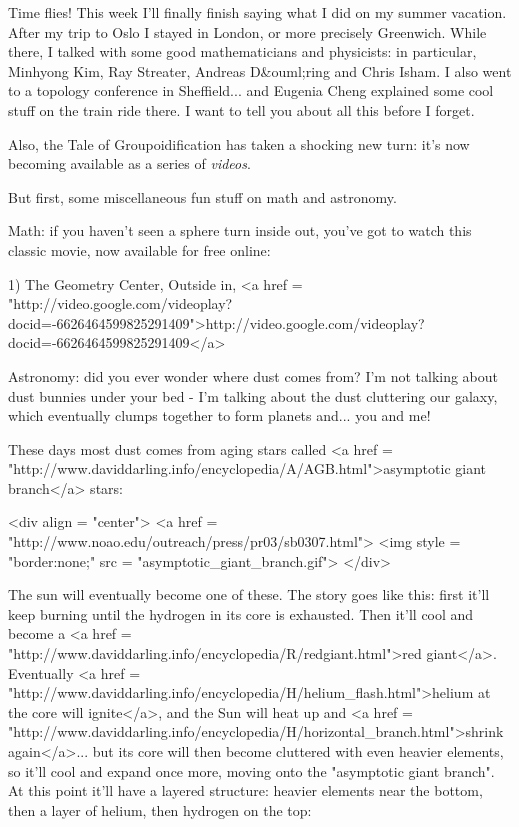 

Time flies!  This week I'll finally finish saying what I did on 
my summer vacation.  After my trip to Oslo I stayed in London, 
or more precisely Greenwich.  While there, I talked with some good 
mathematicians and physicists: in particular, Minhyong Kim, Ray 
Streater, Andreas D&ouml;ring and Chris Isham.  I also went to a 
topology conference in Sheffield... and Eugenia Cheng explained
some cool stuff on the train ride there.  I want to tell you about 
all this before I forget.

Also, the Tale of Groupoidification has taken a shocking new
turn: it's now becoming available as a series of \emph{videos}.

But first, some miscellaneous fun stuff on math and astronomy.  

Math: if you haven't seen a sphere turn inside out, you've got 
to watch this classic movie, now available for free online:

1) The Geometry Center, Outside in,
<a href = "http://video.google.com/videoplay?docid=-6626464599825291409">http://video.google.com/videoplay?docid=-6626464599825291409</a>

Astronomy: did you ever wonder where dust comes from?  I'm 
not talking about dust bunnies under your bed - I'm talking 
about the dust cluttering our galaxy, which eventually clumps 
together to form planets and... you and me!

These days most dust comes from aging stars called <a href =
"http://www.daviddarling.info/encyclopedia/A/AGB.html">asymptotic
giant branch</a> stars: 

<div align = "center">
<a href = "http://www.noao.edu/outreach/press/pr03/sb0307.html">
<img style = "border:none;" src = "asymptotic_giant_branch.gif">
</div>

The sun will eventually become one of these.
The story goes like this: first it'll keep burning until the hydrogen
in its core is exhausted.  Then it'll cool and become a <a href = "http://www.daviddarling.info/encyclopedia/R/redgiant.html">red giant</a>.
Eventually <a href = "http://www.daviddarling.info/encyclopedia/H/helium_flash.html">helium at the core will ignite</a>, and the Sun will heat up and
<a href = "http://www.daviddarling.info/encyclopedia/H/horizontal_branch.html">shrink again</a>... but its core will then become cluttered with even
heavier elements, so it'll cool and expand once more, moving onto the
"asymptotic giant branch".  At this point it'll have a layered
structure: heavier elements near the bottom, then a layer of helium,
then hydrogen on the top:

